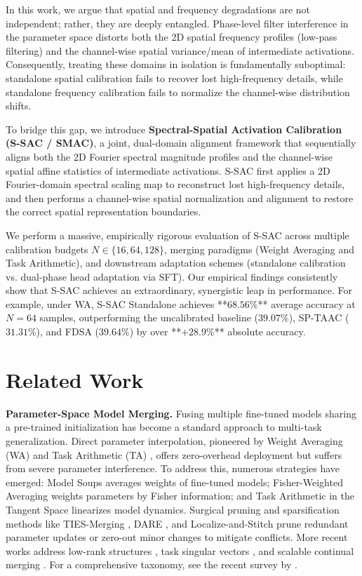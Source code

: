 \documentclass{article}
\theoremstyle{plain}
\theoremstyle{definition}
\theoremstyle{remark}
\begin{document}
In this work, we argue that spatial and frequency degradations are not independent; rather, they are deeply entangled. Phase-level filter interference in the parameter space distorts both the 2D spatial frequency profiles (low-pass filtering) and the channel-wise spatial variance/mean of intermediate activations. Consequently, treating these domains in isolation is fundamentally suboptimal: standalone spatial calibration fails to recover lost high-frequency details, while standalone frequency calibration fails to normalize the channel-wise distribution shifts.

To bridge this gap, we introduce \textbf{Spectral-Spatial Activation Calibration (S-SAC / SMAC)}, a joint, dual-domain alignment framework that sequentially aligns both the 2D Fourier spectral magnitude profiles and the channel-wise spatial affine statistics of intermediate activations. S-SAC first applies a 2D Fourier-domain spectral scaling map to reconstruct lost high-frequency details, and then performs a channel-wise spatial normalization and alignment to restore the correct spatial representation boundaries.

We perform a massive, empirically rigorous evaluation of S-SAC across multiple calibration budgets $N \in \{16, 64, 128\}$, merging paradigms (Weight Averaging and Task Arithmetic), and downstream adaptation schemes (standalone calibration vs. dual-phase head adaptation via SFT). Our empirical findings consistently show that S-SAC achieves an extraordinary, synergistic leap in performance. For example, under WA, S-SAC Standalone achieves **$68.56\%$** average accuracy at $N=64$ samples, outperforming the uncalibrated baseline ($39.07\%$), SP-TAAC ($31.31\%$), and FDSA ($39.64\%$) by over **$+28.9\%$** absolute accuracy.

\section{Related Work}
\label{sec:related_work}
\textbf{Parameter-Space Model Merging.} 
Fusing multiple fine-tuned models sharing a pre-trained initialization has become a standard approach to multi-task generalization. Direct parameter interpolation, pioneered by Weight Averaging (WA) \cite{izmailov2018averaging} and Task Arithmetic (TA) \cite{ilharco2022editing}, offers zero-overhead deployment but suffers from severe parameter interference. To address this, numerous strategies have emerged: Model Soups \cite{wortsman2022model} averages weights of fine-tuned models; Fisher-Weighted Averaging \cite{matena2022merging} weights parameters by Fisher information; and Task Arithmetic in the Tangent Space \cite{ortiz2023task} linearizes model dynamics. Surgical pruning and sparsification methods like TIES-Merging \cite{yadav2023ties}, DARE \cite{yu2024language}, and Localize-and-Stitch \cite{he2025localize} prune redundant parameter updates or zero-out minor changes to mitigate conflicts. More recent works address low-rank structures \cite{zhao2025lowrank}, task singular vectors \cite{tsv2024merge}, and scalable continual merging \cite{tang2025merging, wei2025modeling}. For a comprehensive taxonomy, see the recent survey by \cite{song2026model}.
\end{document}
